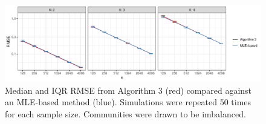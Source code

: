 \documentclass[12pt]{article}
\begin{document}
\begin{figure}[H]

{\centering \includegraphics{summary_files/figure-latex/lambda_est_k_imba-1}

}

\caption{Median and IQR RMSE from Algorithm 3 (red) compared against an MLE-based method (blue). Simulations were repeated 50 times for each sample size. Communities were drawn to be imbalanced.}\label{fig:lambda_est_k_imba}
\end{figure}

\end{document}
